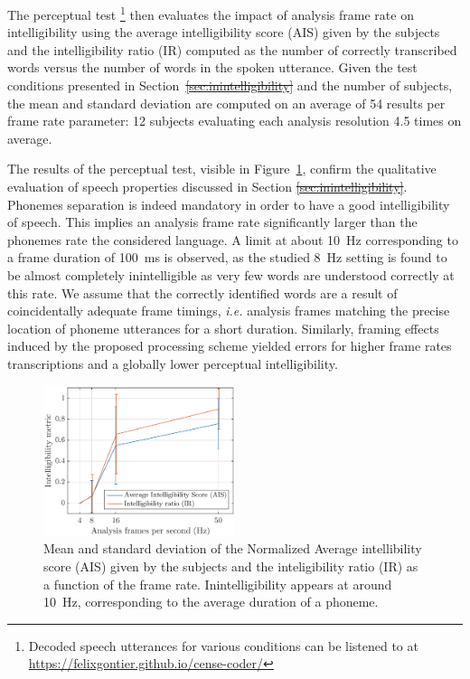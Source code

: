 \documentclass[sensors,article,submit,moreauthors,pdftex,10pt,a4paper]{mdpi}
\providecommand{\DIFaddtex}[1]{{\protect\color{blue}\uwave{#1}}} %
\providecommand{\DIFdeltex}[1]{{\protect\color{red}\sout{#1}}}                      %
\providecommand{\DIFaddbegin}{} %
\providecommand{\DIFaddend}{} %
\providecommand{\DIFdelbegin}{} %
\providecommand{\DIFdelend}{} %
\providecommand{\DIFadd}[1]{\texorpdfstring{\DIFaddtex{#1}}{#1}} %
\providecommand{\DIFdel}[1]{\texorpdfstring{\DIFdeltex{#1}}{}} %
\begin{document}
The perceptual test \footnote{Decoded speech utterances for various conditions can be listened to at \url{https://felixgontier.github.io/cense-coder/}} then evaluates the impact of analysis frame rate on intelligibility using the average intelligibility score (AIS) given by the subjects and the intelligibility ratio (IR) computed as the number of correctly transcribed words versus the number of words in the spoken utterance. Given the test conditions presented in Section~\DIFdelbegin \DIFdel{\ref{sec:inintelligibility} }\DIFdelend \DIFaddbegin \DIFadd{\ref{sec:inintelligibility_p} }\DIFaddend and the number of subjects, the mean and standard deviation are computed on an average of 54 results per frame rate parameter: 12 subjects evaluating each analysis resolution 4.5 times on average.

The results of the perceptual test, visible in Figure~\ref{fig:subj_int}, confirm the qualitative evaluation of speech properties discussed in Section \DIFdelbegin \DIFdel{\ref{sec:inintelligibility}}\DIFdelend \DIFaddbegin \DIFadd{\ref{sec:inintelligibility_p}}\DIFaddend . Phonemes separation is indeed mandatory in order to have a good intelligibility of speech. This implies an analysis frame rate significantly larger than the phonemes rate the considered language. A limit at about 10~Hz corresponding to a frame duration of 100~ms is observed, as the studied 8~Hz setting is found to be almost completely inintelligible as very few words are understood correctly at this rate. We assume that the correctly identified words are a result of coincidentally adequate frame timings, \textit{i.e.} analysis frames matching the precise location of phoneme utterances for a short duration. Similarly, framing effects induced by the proposed processing scheme yielded errors for higher frame rates transcriptions and a globally lower perceptual intelligibility.\\

\begin{figure}[htbp]
	\centering
		\includegraphics[width=0.5\textwidth]{figures/subj_int.eps}
	\caption{Mean and standard deviation of the Normalized Average intellibility score (AIS) given by the subjects and the inteligibility ratio (IR) as a function of the frame rate. Inintelligibility appears at around 10~Hz, corresponding to the average duration of a phoneme.}
	\label{fig:subj_int}
\end{figure}
\end{document}
